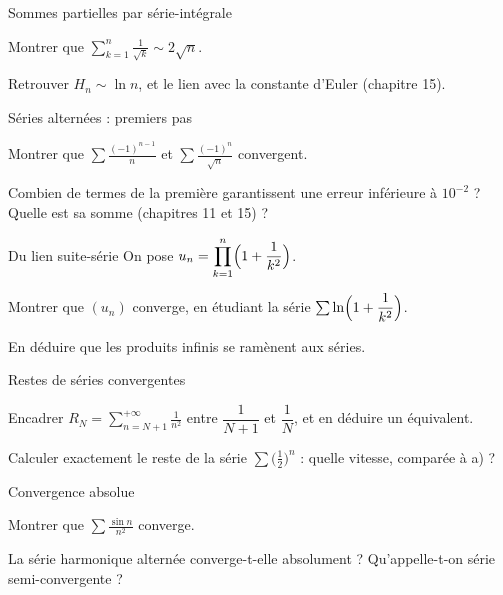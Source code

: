 \begin{exercice}[1]{Sommes partielles par série-intégrale}
\begin{questions}
  \item Montrer que
    $\displaystyle\sum_{k=1}^{n}\frac{1}{\sqrt k}\sim2\sqrt n$.
  \item Retrouver $H_n\sim\ln n$, et le lien avec la constante d'Euler
    (chapitre 15).
\end{questions}
\end{exercice}

\begin{exercice}[1]{Séries alternées : premiers pas}
\begin{questions}
  \item Montrer que $\displaystyle\sum\frac{(-1)^{n-1}}{n}$ et
    $\displaystyle\sum\frac{(-1)^{n}}{\sqrt n}$ convergent.
  \item Combien de termes de la première garantissent une erreur
    inférieure à $10^{-2}$ ? Quelle est sa somme (chapitres 11 et 15) ?
\end{questions}
\end{exercice}


\begin{exercice}[2]{Du lien suite-série}
On pose $u_n=\displaystyle\prod_{k=1}^{n}\Bigl(1+\frac{1}{k^{2}}\Bigr)$.
\begin{questions}
  \item Montrer que $(u_n)$ converge, en étudiant la série
    $\sum\ln\Bigl(1+\dfrac{1}{k^{2}}\Bigr)$.
  \item En déduire que les produits infinis se ramènent aux séries.
\end{questions}
\end{exercice}

\begin{exercice}[2]{Restes de séries convergentes}
\begin{questions}
  \item Encadrer $R_N=\displaystyle\sum_{n=N+1}^{+\infty}\frac{1}{n^{2}}$
    entre $\dfrac{1}{N+1}$ et $\dfrac1N$, et en déduire un équivalent.
  \item Calculer exactement le reste de la série
    $\sum\bigl(\tfrac12\bigr)^{n}$ : quelle vitesse, comparée à a) ?
\end{questions}
\end{exercice}

\begin{exercice}[2]{Convergence absolue}
\begin{questions}
  \item Montrer que $\displaystyle\sum\frac{\sin n}{n^{2}}$ converge.
  \item La série harmonique alternée converge-t-elle absolument ?
    Qu'appelle-t-on série semi-convergente ?
\end{questions}
\end{exercice}


